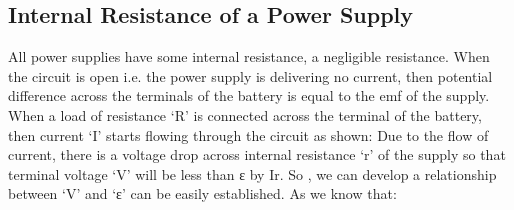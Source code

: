 \subsection{Internal Resistance of a Power Supply}
All power supplies have some internal resistance, a negligible resistance. When the circuit is open i.e. the power supply is delivering no current, then potential difference across the terminals of the battery is equal to the emf of the supply. When a load of resistance ‘R’ is connected across the terminal of the battery, then current ‘I’ starts flowing through the circuit as shown:
Due to the flow of current, there is a voltage drop across internal resistance ‘r’ of the supply so that terminal voltage ‘V’ will be less than ε  by Ir. So , we can develop a relationship between ‘V’ and ‘ε’ can be easily established.
As we know that:

